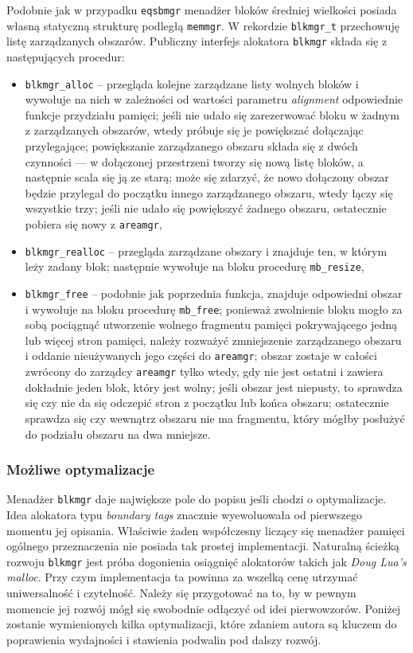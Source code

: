 \documentclass[12pt,a4paper,titlepage,twoside]{mwart}
\begin{document}
Podobnie jak w przypadku \verb+eqsbmgr+ menadżer bloków średniej wielkości
posiada własną statyczną strukturę podległą \verb+memmgr+. W rekordzie
\verb+blkmgr_t+ przechowuję listę zarządzanych obszarów. Publiczny interfejs
alokatora \verb+blkmgr+ składa się z następujących procedur:
\begin{itemize}
\item \verb+blkmgr_alloc+ -- przegląda kolejne zarządzane listy wolnych bloków
i wywołuje na nich w zależności od wartości parametru \textit{alignment}
odpowiednie funkcje przydziału pamięci; jeśli nie udało się zarezerwować bloku
w żadnym z zarządzanych obszarów, wtedy próbuje się je powiększać dołączając
przylegające; powiększanie zarządzanego obszaru składa się z dwóch czynności
--- w dołączonej przestrzeni tworzy się nową listę bloków, a następnie scala
się ją ze starą; może się zdarzyć, że nowo dołączony obszar będzie przylegał do
początku innego zarządzanego obszaru, wtedy łączy się wszystkie trzy; jeśli nie
udało się powiększyć żadnego obszaru, ostatecznie pobiera się nowy z
\texttt{areamgr},
\item \verb+blkmgr_realloc+ -- przegląda zarządzane obszary i znajduje ten, w
którym leży zadany blok; następnie wywołuje na bloku procedurę
\verb+mb_resize+,
\item \verb+blkmgr_free+ -- podobnie jak poprzednia funkcja, znajduje
odpowiedni obszar i wywołuje na bloku procedurę \verb+mb_free+; ponieważ
zwolnienie bloku mogło za sobą pociągnąć utworzenie wolnego fragmentu pamięci
pokrywającego jedną lub więcej stron pamięci, należy rozważyć zmniejszenie
zarządzanego obszaru i oddanie nieużywanych jego części do \verb+areamgr+;
obszar zostaje w całości zwrócony do zarządcy \verb+areamgr+ tylko wtedy, gdy
nie jest ostatni i zawiera dokładnie jeden blok, który jest wolny; jeśli obszar
jest niepusty, to sprawdza się czy nie da się odczepić stron z początku lub
końca obszaru; ostatecznie sprawdza się czy wewnątrz obszaru nie ma fragmentu,
który mógłby posłużyć do podziału obszaru na dwa mniejsze.
\end{itemize}

\subsubsection{Możliwe optymalizacje}

Menadżer \texttt{blkmgr} daje największe pole do popisu jeśli chodzi o
optymalizacje. Idea alokatora typu \textit{boundary tags} znacznie wyewoluowała
od pierwszego momentu jej opisania. Właściwie żaden współczesny liczący się
menadżer pamięci ogólnego przeznaczenia nie posiada tak prostej implementacji.
Naturalną ścieżką rozwoju \texttt{blkmgr} jest próba dogonienia osiągnięć
alokatorów takich jak \textit{Doug Lua's malloc}. Przy czym implementacja ta
powinna za wszelką cenę utrzymać uniwersalność i czytelność. Należy się
przygotować na to, by w pewnym momencie jej rozwój mógł się swobodnie odłączyć
od idei pierwowzorów. Poniżej zostanie wymienionych kilka optymalizacji, które
zdaniem autora są kluczem do poprawienia wydajności i stawienia podwalin pod
dalszy rozwój.
\end{document}
